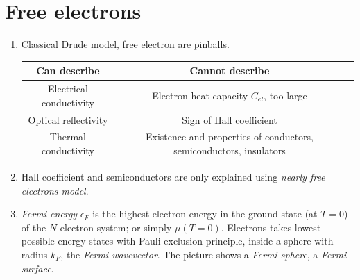 \documentclass{article}
\theoremstyle{remark}
\theoremstyle{remark}
\begin{document}
\section*{Free electrons}

\begin{enumerate}
    \item Classical Drude model, free electron are pinballs.\\  \begin{tabular}{Sc|c}
        Can describe & Cannot describe\\\hline
        Electrical conductivity & Electron heat capacity $C_{el}$, too large\\
        Optical reflectivity & Sign of Hall coefficient\\
        Thermal conductivity & Existence and properties of conductors, semiconductors, insulators
    \end{tabular}
    \item Hall coefficient and semiconductors are only explained using \emph{nearly free electrons model}.
    \item \textit{Fermi energy} $\epsilon_F$ is the highest electron energy in the ground state (at $T=0$) of the $N$ electron system; or simply $\mu(T=0)$. Electrons takes lowest possible energy states with Pauli exclusion principle, inside a sphere with radius $k_F$, the \textit{Fermi wavevector}.
    The picture shows a \textit{Fermi sphere}, a \textit{Fermi surface}.\newline
        \begin{minipage}{0.3\linewidth}
            \begin{center}

\end{center}
\end{minipage}
\end{enumerate}
\end{document}
